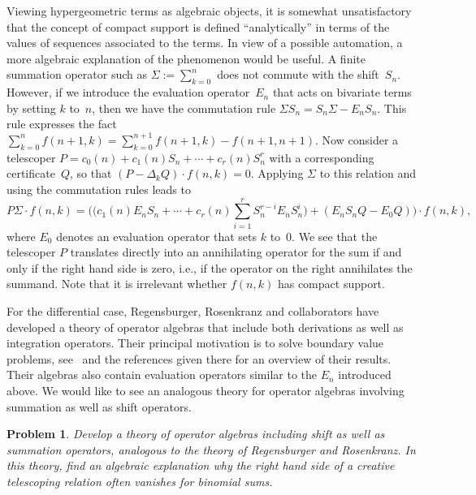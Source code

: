 \documentclass[a4paper,draft]{amsart}
\newtheorem{problem}{Problem}
\begin{document}
 Viewing hypergeometric terms as algebraic objects, it is somewhat
 unsatisfactory that the concept of compact support is defined ``analytically''
 in terms of the values of sequences associated to the terms. In view of a
 possible automation, a more algebraic explanation of the phenomenon would be
 useful. A finite summation operator such as $\Sigma:=\sum_{k=0}^n$ does not
 commute with the shift~$S_n$. However, if we introduce the evaluation
 operator~$E_n$ that acts on bivariate terms by setting $k$ to~$n$, then we have
 the commutation rule $\Sigma S_n = S_n\Sigma - E_nS_n$. This rule expresses
 the fact $\sum_{k=0}^n f(n+1,k)=\sum_{k=0}^{n+1}f(n+1,k) - f(n+1,n+1)$.
 Now consider a telescoper $P=c_0(n)+c_1(n)S_n+\cdots+c_r(n)S_n^r$ with a
 corresponding certificate~$Q$, so that $(P - \Delta_k Q)\cdot f(n,k)=0$. Applying $\Sigma$ to
 this relation and using the commutation rules leads to
 \[
 P\Sigma\cdot f(n,k) =
 \biggl(\biggl(c_1(n)E_nS_n + \cdots + c_r(n)\sum_{i=1}^r S_n^{r-i}E_nS_n^i\biggr) + (E_nS_nQ - E_0Q)\biggr)\cdot f(n,k),
 \]
 where $E_0$ denotes an evaluation operator that sets $k$ to~$0$.
 We see that the telescoper $P$ translates directly into an annihilating operator for the
 sum if and only if the right hand side is zero, i.e., if the operator on the right annihilates the summand.
 Note that it is irrelevant whether $f(n,k)$ has compact support.

 For the differential case, Regensburger, Rosenkranz and collaborators have
 developed a theory of operator algebras that include both derivations as well
 as integration operators. Their principal motivation is to solve boundary value
 problems,
 see~\cite{rosenkranz08,rosenkranz08a,regensburger09,guo14,regensburger16} and
 the references given there for an overview of their results. Their algebras
 also contain evaluation operators similar to the $E_n$ introduced above. We
 would like to see an analogous theory for operator algebras involving summation
 as well as shift operators.

 \begin{problem}
   Develop a theory of operator algebras including shift as well as summation operators,
   analogous to the theory of Regensburger and Rosenkranz.
   In this theory, find an algebraic explanation why the right hand side of a creative
   telescoping relation often vanishes for binomial sums.
 \end{problem}
\end{document}
